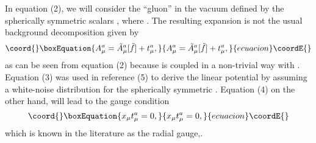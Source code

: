 \documentclass[a4paper,12pt]{article}
\begin{document}
In equation (2), we will consider the ``gluon'' \coordHE{} in the vacuum defined by the spherically symmetric scalars \coordHE{}, where \coordHE{}.  The resulting expansion is not the usual background decomposition given by
\begin{equation}\coord{}\boxEquation{\label{12}
A^{a}_{\mu} = \tilde{A}^{a}_{\mu}[\tilde{f}]+t^{a}_{\mu},
}{A^{a}_{\mu} = \tilde{A}^{a}_{\mu}[\tilde{f}]+t^{a}_{\mu},
}{ecuacion}\coordE{}\end{equation}
as can be seen from equation (2) because \coordHE{} is coupled in a non-trivial way with \coordHE{}.  Equation (3) was used in reference (5) to derive the linear potential by assuming a white-noise distribution for the spherically symmetric \coordHE{}.  Equation (4) on the other hand, will lead to the gauge condition
\begin{equation}\coord{}\boxEquation{\label{13}
x_{\mu}t^{a}_{\mu} = 0,
}{x_{\mu}t^{a}_{\mu} = 0,
}{ecuacion}\coordE{}\end{equation}
which is known in the literature as the radial gauge\cite{linear},\cite{string}.
\end{document}
